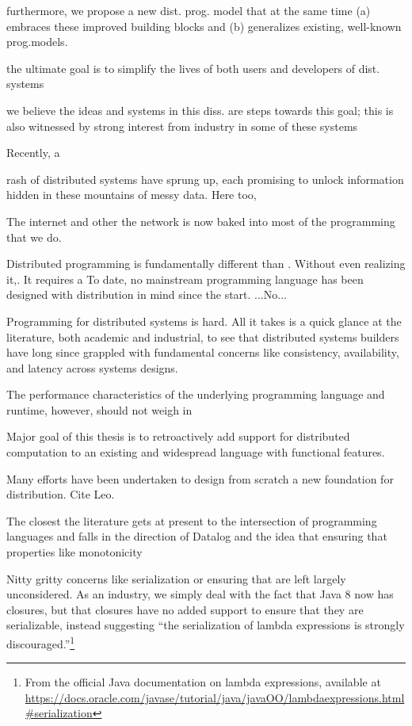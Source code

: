 furthermore, we propose a new dist. prog. model that at the same time (a)
embraces these improved building blocks and (b) generalizes existing, well-known
prog.models.

the ultimate goal is to simplify the lives of both users and developers of dist.
systems

we believe the ideas and systems in this diss. are steps towards this goal; this
is also witnessed by strong interest from industry in some of these systems


 Recently, a

 rash of distributed systems have
sprung up, each promising to unlock information hidden in these mountains of
messy data. Here too,

The internet and other the network is
now baked into most of the programming that we do.


Distributed programming is fundamentally different than . Without even realizing
it,. It requires a
To date, no mainstream programming language has been designed with distribution in mind since the start. ...No...

Programming for distributed systems is hard. All it takes is a quick glance at
the literature, both academic and industrial, to see that distributed systems
builders have long since grappled with fundamental concerns like consistency,
availability, and latency across systems designs.

The performance characteristics of the underlying programming language and
runtime, however, should not weigh in

Major goal of this thesis is to retroactively add support for distributed
computation to an existing and widespread language with functional features.

Many efforts have been undertaken to design from scratch a new foundation for
distribution. Cite Leo.


The closest the literature gets at present to the intersection of programming
languages and falls in the direction of Datalog and the idea that ensuring that
properties like monotonicity

Nitty gritty concerns like serialization or ensuring that are left largely
unconsidered. As an industry, we simply deal with the fact that Java 8 now has
closures, but that closures have no added support to ensure that they are
serializable, instead suggesting ``the serialization of lambda expressions is
strongly discouraged.''\footnote{From the official Java documentation on lambda
expressions, available at
\url{https://docs.oracle.com/javase/tutorial/java/javaOO/lambdaexpressions.html\#serialization}}

